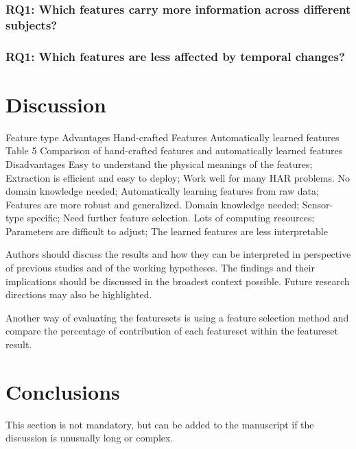 \documentclass[journal,article,submit,moreauthors,pdftex]{Definitions/mdpi}
\begin{document}
\subsubsection{RQ1: Which features carry more information across different subjects?}
\subsubsection{RQ1: Which features are less affected by temporal changes?}

\section{Discussion}

Feature type Advantages
Hand-crafted Features
Automatically learned features
Table 5 Comparison of hand-crafted features and automatically learned features Disadvantages
Easy to understand the physical meanings of the features; Extraction is efficient and easy to deploy; Work well for many HAR problems.
No domain knowledge needed; Automatically learning features from raw data; Features are more robust and generalized.
Domain knowledge needed; Sensor-type specific; Need further feature selection.
Lots of computing resources; Parameters are difficult to adjust; The learned features are less interpretable


Authors should discuss the results and how they can be interpreted in perspective of previous studies and of the working hypotheses. The findings and their implications should be discussed in the broadest context possible. Future research directions may also be highlighted.

Another way of evaluating the featuresets is using a feature selection method and compare the percentage of contribution of each featureset within the featureset result.


\section{Conclusions}

This section is not mandatory, but can be added to the manuscript if the discussion is unusually long or complex.

\vspace{6pt} 

\end{document}
